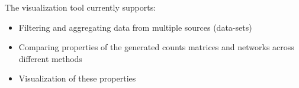     The visualization tool currently supports:
    \begin{itemize}
      \item Filtering and aggregating data from multiple sources (data-sets)
      \item Comparing properties of the generated counts matrices and networks across different methods
      \item Visualization of these properties
    \end{itemize}
